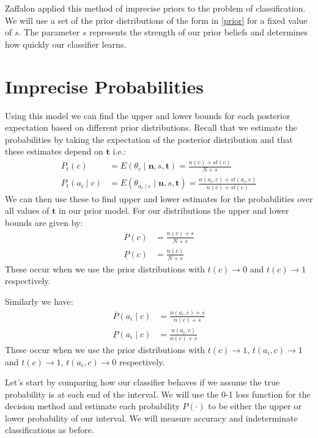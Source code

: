 Zaffalon applied this method of imprecise priors to the problem of classification.
We will use a set of the prior distributions of the form in \cref{prior} for a fixed value of $s$.
The parameter $s$ represents the strength of our prior beliefs and determines how quickly our classifier learns.

\section{Imprecise Probabilities}

Using this model we can find the upper and lower bounds for each posterior expectation based on different prior distributions.
Recall that we estimate the probabilities by taking the expectation of the posterior distribution and that these estimates depend on $\mathbf{t}$ i.e.:
\begin{align}
	P_t(c) & = E(\theta_c \mid \mathbf{n},s,\mathbf{t}) = \frac{n(c) + st(c)}{N + s} \\
	P_t(a_i \mid c) & = E(\theta_{a_i \mid c} \mid \mathbf{n},s,\mathbf{t}) = \frac{n(a_i, c) + st(a_i, c)}{n(c) + st(c)}
\end{align}
We can then use these to find upper and lower estimates for the probabilities over all values of $\mathbf{t}$ in our prior model.
For our distributions the upper and lower bounds are given by:
\begin{align}
	\overline{P}(c) & = \frac{n(c) + s}{N+s} \\
	\underline{P}(c) & = \frac{n(c)}{N+s}
\end{align}
These occur when we use the prior distributions with $t(c) \rightarrow 0$ and $t(c) \rightarrow 1$ respectively.

Similarly we have:
\begin{align}
	\overline{P}(a_i \mid c) & = \frac{n(a_i, c) + s}{n(c)+s} \\
	\underline{P}(a_i \mid c) & = \frac{n(a_i, c)}{n(c)+s}
\end{align}
These occur when we use the prior distributions with $t(c) \rightarrow 1$, $t(a_i, c)\rightarrow1$ and $t(c) \rightarrow 1$, $t(a_i, c)\rightarrow0$ respectively.

Let's start by comparing how our classifier behaves if we assume the true probability is at each end of the interval.
We will use the 0-1 loss function for the decision method and estimate each probability $P(\cdot)$ to be either the upper or lower probability of our interval.
We will measure accuracy and indeterminate classifications as before.

